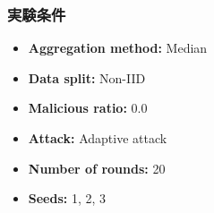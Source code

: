 \documentclass[a4j,twocolumn,dvipdfmx]{jsarticle}
\begin{document}
\subsubsection{実験条件}

\begin{itemize}
    \item \textbf{Aggregation method:} Median
    \item \textbf{Data split:} Non-IID
    \item \textbf{Malicious ratio:} 0.0
    \item \textbf{Attack:} Adaptive attack
    \item \textbf{Number of rounds:} 20
    \item \textbf{Seeds:} 1, 2, 3
\end{itemize}

\end{document}
